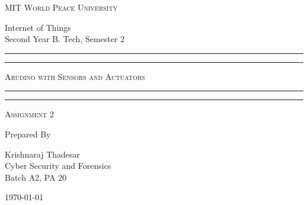 \documentclass[11pt]{article}
\begin{document}
\begin{titlepage}
	\centering


	\huge\textsc{
		MIT World Peace University
	}\\

	\vspace{0.75\baselineskip} %

	\LARGE{
		Internet of Things\\
		Second Year B. Tech, Semester 2
	}

	\vfill %


	\rule{\textwidth}{1.6pt}\vspace*{-\baselineskip}\vspace*{2pt}
	\rule{\textwidth}{0.6pt}
	\vspace{0.75\baselineskip} %



	\huge{\textsc{
			Arudino with Sensors and Actuators
		}} \\



	\vspace{0.5\baselineskip} %
	\rule{\textwidth}{0.6pt}\vspace*{-\baselineskip}\vspace*{2.8pt}
	\rule{\textwidth}{1.6pt}

	\vspace{1\baselineskip} %


	\LARGE\textsc{
		Assignment 2
	} %
	\vfill


	Prepared By
	\vspace{0.5\baselineskip} %

	\Large{
		Krishnaraj Thadesar \\
		Cyber Security and Forensics\\
		Batch A2, PA 20
	}


	\vspace{0.5\baselineskip} %
	\today

\end{titlepage}
\end{document}
